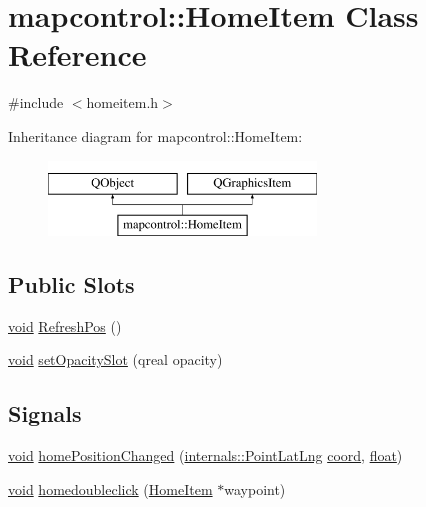 \hypertarget{classmapcontrol_1_1_home_item}{\section{mapcontrol\-:\-:Home\-Item Class Reference}
\label{classmapcontrol_1_1_home_item}
}


{\ttfamily \#include $<$homeitem.\-h$>$}

Inheritance diagram for mapcontrol\-:\-:Home\-Item\-:\begin{figure}[H]
\begin{center}
\leavevmode
\includegraphics[height=2.000000cm]{classmapcontrol_1_1_home_item}
\end{center}
\end{figure}
\subsection*{Public Slots}
\begin{DoxyCompactItemize}
\item 
\hyperlink{group___u_a_v_objects_plugin_ga444cf2ff3f0ecbe028adce838d373f5c}{void} \hyperlink{group___o_p_map_widget_ga1c60e950a733d8e38796cfe092fb4154}{Refresh\-Pos} ()
\item 
\hyperlink{group___u_a_v_objects_plugin_ga444cf2ff3f0ecbe028adce838d373f5c}{void} \hyperlink{group___o_p_map_widget_ga47780346c1ba4c4076c12ea2555a1d8e}{set\-Opacity\-Slot} (qreal opacity)
\end{DoxyCompactItemize}
\subsection*{Signals}
\begin{DoxyCompactItemize}
\item 
\hyperlink{group___u_a_v_objects_plugin_ga444cf2ff3f0ecbe028adce838d373f5c}{void} \hyperlink{group___o_p_map_widget_ga0e1509f9592dd23581de347130ed8d85}{home\-Position\-Changed} (\hyperlink{structinternals_1_1_point_lat_lng}{internals\-::\-Point\-Lat\-Lng} \hyperlink{glext_8h_a4ad6f000813afde2b5727cbfdddc75be}{coord}, \hyperlink{_super_l_u_support_8h_a6a1bb6ed41f44b60e7bd83b0e9945aa7}{float})
\item 
\hyperlink{group___u_a_v_objects_plugin_ga444cf2ff3f0ecbe028adce838d373f5c}{void} \hyperlink{group___o_p_map_widget_ga7d84c3892299fbfa670e98cca3cb871d}{homedoubleclick} (\hyperlink{classmapcontrol_1_1_home_item}{Home\-Item} $\ast$waypoint)
\end{DoxyCompactItemize}
